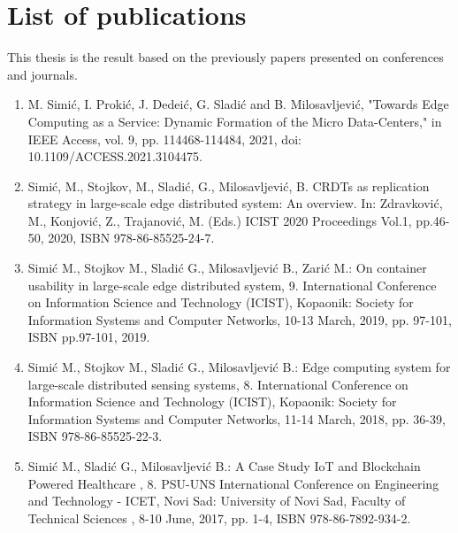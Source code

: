 \chapter*{List of publications}
%
This thesis is the result based on the previously papers presented on conferences and journals.

\begin{enumerate}[start=1,label={(\bfseries \arabic*)}]
	\item M. Simić, I. Prokić, J. Dedeić, G. Sladić and B. Milosavljević, "Towards Edge Computing as a Service: Dynamic Formation of the Micro Data-Centers," in IEEE Access, vol. 9, pp. 114468-114484, 2021, doi: 10.1109/ACCESS.2021.3104475.
	\item Simić, M., Stojkov, M., Sladić, G., Milosavljević, B.  CRDTs as replication strategy in large-scale edge distributed system: An overview. In: Zdravković, M., Konjović, Z., Trajanović, M. (Eds.) ICIST 2020 Proceedings Vol.1, pp.46-50, 2020, ISBN 978-86-85525-24-7.
	\item Simić M., Stojkov M., Sladić G., Milosavljević B., Zarić M.:   On container usability in large-scale edge distributed system, 9. International Conference on Information Science and Technology (ICIST), Kopaonik: Society for Information Systems and Computer Networks, 10-13 March, 2019, pp. 97-101, ISBN pp.97-101, 2019.
	\item Simić M., Stojkov M., Sladić G., Milosavljević B.:  Edge computing system for large-scale distributed sensing systems, 8. International Conference on Information Science and Technology (ICIST), Kopaonik: Society for Information Systems and Computer Networks, 11-14 March, 2018, pp. 36-39, ISBN 978-86-85525-22-3.
	\item Simić M., Sladić G., Milosavljević B.:  A Case Study IoT and Blockchain Powered Healthcare , 8. PSU-UNS International Conference on Engineering and Technology - ICET, Novi Sad: University of Novi Sad, Faculty of Technical Sciences , 8-10 June, 2017, pp. 1-4, ISBN 978-86-7892-934-2.
\end{enumerate}
%
%